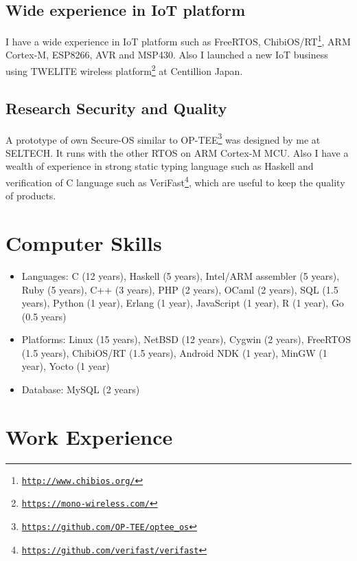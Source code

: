 \documentclass[letterpaper]{article}
\begin{document}
\subsection*{Wide experience in IoT platform}

I have a wide experience in IoT platform such as FreeRTOS, ChibiOS/RT\footnote{\href{http://www.chibios.org/}{\tt http://www.chibios.org/}}, ARM Cortex-M, ESP8266, AVR and MSP430. Also I launched a new IoT business using TWELITE wireless platform\footnote{\href{https://mono-wireless.com/}{\tt https://mono-wireless.com/}} at Centillion Japan.

\subsection*{Research Security and Quality}

A prototype of own Secure-OS similar to OP-TEE\footnote{\href{https://github.com/OP-TEE/optee\_os}{\tt https://github.com/OP-TEE/optee\_os}} was designed by me at SELTECH. It runs with the other RTOS on ARM Cortex-M MCU. Also I have a wealth of experience in strong static typing language such as Haskell and verification of C language such as VeriFast\footnote{\href{https://github.com/verifast/verifast}{\tt https://github.com/verifast/verifast}}, which are useful to keep the quality of products.

\section*{Computer Skills}

\begin{itemize}
  \item Languages: C (12 years), Haskell (5 years), Intel/ARM assembler (5 years), Ruby (5 years), C++ (3 years), PHP (2 years), OCaml (2 years), SQL (1.5 years), Python (1 year), Erlang (1 year), JavaScript (1 year), R (1 year), Go (0.5 years)
  \item Platforms: Linux (15 years), NetBSD (12 years), Cygwin (2 years), FreeRTOS (1.5 years), ChibiOS/RT (1.5 years), Android NDK (1 year), MinGW (1 year), Yocto (1 year)
  \item Database: MySQL (2 years)
\end{itemize}

\newpage

\section*{Work Experience}
\end{document}
